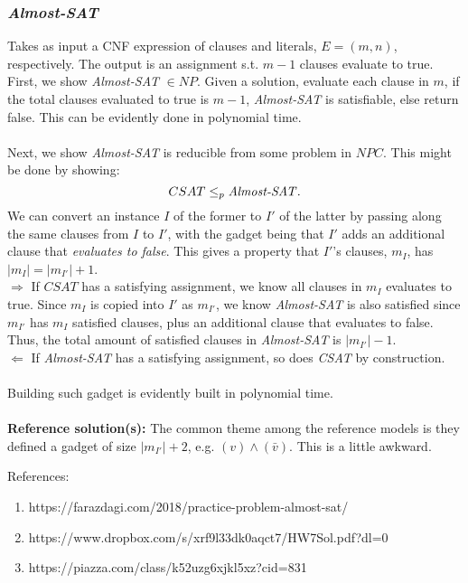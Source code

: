 \documentclass{article}
\theoremstyle{definition}
\begin{document}
\subsubsection{\textit{Almost-SAT}}
Takes as input a CNF expression of clauses and literals, $E = (m,n)$, respectively. The output is an assignment s.t. $m-1$ clauses evaluate to true.\\
First, we show \textit{Almost-SAT} $\in NP$. Given a solution, evaluate each clause in $m$, if the total clauses evaluated to true is $m-1$, \textit{Almost-SAT} is satisfiable, else return false. This can be evidently done in polynomial time.\\\\
Next, we show \textit{Almost-SAT} is reducible from some problem in $NPC$. This might be done by showing:
$$CSAT \leq_p \text{\textit{Almost-SAT}}.$$
We can convert an instance $I$ of the former to $I'$ of the latter by passing along the same clauses from $I$ to $I'$, with the gadget being that $I'$ adds an additional clause that \textit{evaluates to false}. This gives a property that $I'$'s clauses, $m_I$, has $|m_I| = |m_{I'}|+1$.\\
$\Rightarrow$ If $CSAT$ has a satisfying assignment, we know all clauses in $m_I$ evaluates to true. Since $m_I$ is copied into $I'$ as $m_{I'}$, we know \textit{Almost-SAT} is also satisfied since $m_{I'}$ has $m_{I}$ satisfied clauses, plus an additional clause that evaluates to false. Thus, the total amount of satisfied clauses in \textit{Almost-SAT} is $|m_{I'}|-1$.\\
$\Leftarrow$ If \textit{Almost-SAT} has a satisfying assignment, so does \textit{CSAT} by construction.\\\\
Building such gadget is evidently built in polynomial time.\\\\
\textbf{Reference solution(s):} The common theme among the reference models is they defined a gadget of size $|m_{I'}|+2$, e.g. $(v) \land (\bar{v})$. This is a little awkward.

References:
\begin{enumerate}
	\item https://farazdagi.com/2018/practice-problem-almost-sat/
	\item https://www.dropbox.com/s/xrf9l33dk0aqct7/HW7Sol.pdf?dl=0
	\item https://piazza.com/class/k52uzg6xjkl5xz?cid=831
\end{enumerate}
\end{document}
